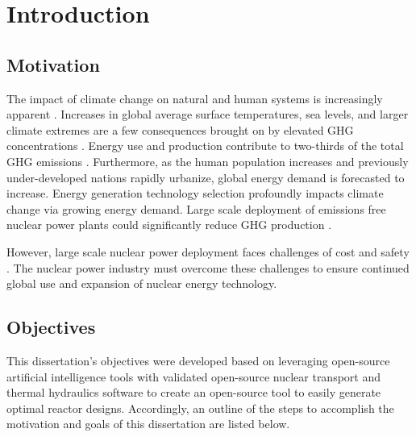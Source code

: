 \chapter{Introduction}


\section{Motivation}
The impact of climate change on natural and human systems is increasingly 
apparent \cite{noauthor_climate_2018}.
Increases in global average surface temperatures, sea levels, and larger climate 
extremes are a few consequences brought on by elevated \gls{GHG} concentrations 
\cite{noauthor_climate_2018}.
Energy use and production contribute to two-thirds of the total \gls{GHG}
emissions \cite{noauthor_climate_2018}.
Furthermore, as the human population increases and previously under-developed 
nations rapidly urbanize, global energy demand is forecasted to increase.  
Energy generation technology selection profoundly impacts climate change via 
growing energy demand. 
Large scale deployment of emissions free nuclear power plants could 
significantly reduce GHG production \cite{noauthor_climate_2018}.  

However, large scale nuclear power deployment faces challenges of cost and 
safety \cite{petti_future_2018}. 
The nuclear power industry must overcome these challenges to ensure continued 
global use and expansion of nuclear energy technology. 



\section{Objectives}
This dissertation's objectives were developed based on leveraging open-source 
artificial intelligence tools with validated open-source nuclear transport and 
thermal hydraulics software to create an open-source tool to easily generate 
optimal reactor designs. 
Accordingly, an outline of the steps to accomplish the motivation and goals 
of this dissertation are listed below. 
